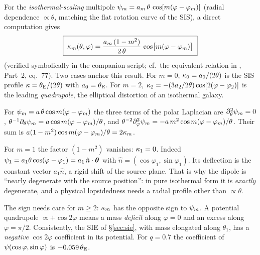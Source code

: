 For the \emph{isothermal-scaling} multipole
$\psi_m = a_m\,\theta\,\cos[m(\varphi-\varphi_m)]$ (radial dependence
$\propto\theta$, matching the flat rotation curve of the SIS), a direct
computation gives
\begin{equation}
    \boxed{\;
    \kappa_m(\theta,\varphi)
    = \frac{a_m\,(1-m^2)}{2\,\theta}\,
      \cos\!\big[m(\varphi-\varphi_m)\big] \; }
    \label{eq:kappa_multipole}
\end{equation}
(verified symbolically in the companion script; cf.\ the equivalent
relation in \citet{schneider_kochanek_wambsganss_2006}, Part~2, eq.~77).
Two cases anchor this result.  For $m=0$,
$\kappa_0 = a_0/(2\theta)$ is the SIS profile
$\kappa = \theta_{\mathrm{E}}/(2\theta)$ with $a_0 = \theta_{\mathrm{E}}$.  For $m=2$,
$\kappa_2 = -(3a_2/2\theta)\cos[2(\varphi-\varphi_2)]$ is the leading
\emph{quadrupole}, the elliptical distortion of an isothermal galaxy.

\begin{derivation}
For $\psi_m = a\,\theta\cos m(\varphi-\varphi_m)$ the three terms of the
polar Laplacian are
$\partial_\theta^2\psi_m = 0$,
$\theta^{-1}\partial_\theta\psi_m = a\cos m(\varphi-\varphi_m)/\theta$, and
$\theta^{-2}\partial_\varphi^2\psi_m = -a\,m^2\cos m(\varphi-\varphi_m)/\theta$.
Their sum is $a(1-m^2)\cos m(\varphi-\varphi_m)/\theta = 2\kappa_m$.
\end{derivation}

\begin{annotation}
For $m = 1$ the factor $(1-m^2)$ vanishes: $\kappa_1 = 0$.  Indeed
$\psi_1 = a_1\theta\cos(\varphi-\varphi_1) = a_1\,\hat{n}\cdot\boldsymbol{\theta}$ with
$\hat n = (\cos\varphi_1,\sin\varphi_1)$.  Its deflection is the constant
vector $a_1\hat{n}$, a rigid shift of the source plane.  That is why the
dipole is ``nearly degenerate with the source position'': in pure isothermal
form it is \emph{exactly} degenerate, and a physical lopsidedness needs a
radial profile other than $\propto\theta$.

The sign needs care for $m \ge 2$: $\kappa_m$ has the opposite sign to $\psi_m$.  A
potential quadrupole $\propto +\cos 2\varphi$ means a mass \emph{deficit} along
$\varphi = 0$ and an excess along $\varphi = \pi/2$.  Consistently, the SIE of
\S\ref{sec:sie}, with mass elongated along $\theta_1$, has a \emph{negative}
$\cos 2\varphi$ coefficient in its potential.  For $q = 0.7$ the coefficient of
$\psi(\cos\varphi,\sin\varphi)$ is $-0.059\,\theta_{\mathrm{E}}$.
\end{annotation}


